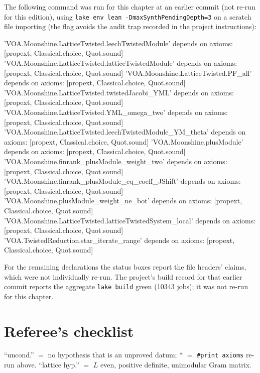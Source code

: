 The following command was run for this chapter at an earlier commit (not re-run for this edition), using
\texttt{lake env lean -DmaxSynthPendingDepth=3} on a scratch file importing
 (the flag avoids the audit trap recorded in the project
instructions):
\begin{plaincode}
'VOA.Moonshine.LatticeTwisted.leechTwistedModule' depends on axioms: [propext, Classical.choice, Quot.sound]
'VOA.Moonshine.LatticeTwisted.latticeTwistedModule' depends on axioms: [propext, Classical.choice, Quot.sound]
'VOA.Moonshine.LatticeTwisted.PF_all' depends on axioms: [propext, Classical.choice, Quot.sound]
'VOA.Moonshine.LatticeTwisted.twistedJacobi_YML' depends on axioms: [propext, Classical.choice, Quot.sound]
'VOA.Moonshine.LatticeTwisted.YML_omega_two' depends on axioms: [propext, Classical.choice, Quot.sound]
'VOA.Moonshine.LatticeTwisted.leechTwistedModule_YM_theta' depends on axioms: [propext, Classical.choice, Quot.sound]
'VOA.Moonshine.plusModule' depends on axioms: [propext, Classical.choice, Quot.sound]
'VOA.Moonshine.finrank_plusModule_weight_two' depends on axioms: [propext, Classical.choice, Quot.sound]
'VOA.Moonshine.finrank_plusModule_eq_coeff_JShift' depends on axioms: [propext, Classical.choice, Quot.sound]
'VOA.Moonshine.plusModule_weight_ne_bot' depends on axioms: [propext, Classical.choice, Quot.sound]
'VOA.Moonshine.LatticeTwisted.latticeTwistedSystem_local' depends on axioms: [propext, Classical.choice, Quot.sound]
'VOA.TwistedReduction.star_iterate_range' depends on axioms: [propext, Classical.choice, Quot.sound]
\end{plaincode}
For the remaining declarations the status boxes report the file headers' claims, which were not
individually re-run.  The project's build record for that earlier commit reports the aggregate \texttt{lake build}
green (10343 jobs); it was not re-run for this chapter.

\section{Referee's checklist}\label{ch08:sec:checklist}

``uncond.'' $=$ no hypothesis that is an unproved datum; $\ast$ $=$ \texttt{\#print axioms} re-run
above.  ``lattice hyp.'' $=$ $L$ even, positive definite, unimodular Gram matrix.

